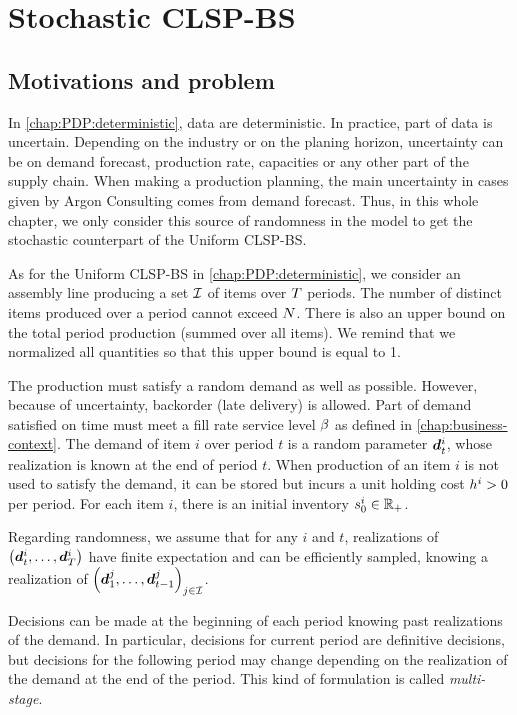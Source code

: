 \chapter{Stochastic CLSP-BS}
\label{chap:PDP:stochastic}

\section{Motivations and problem}


In \cref{chap:PDP:deterministic}, data are deterministic.
In practice, part of data is uncertain.
Depending on the industry or on the planing horizon, uncertainty can be on demand forecast, production rate, capacities or any other part of the supply chain.
When making a production planning, the main uncertainty in cases given by Argon Consulting comes from demand forecast.
Thus, in this whole chapter, we only consider this source of randomness in the model to get the stochastic counterpart of the Uniform CLSP-BS.


As for the Uniform CLSP-BS in \cref{chap:PDP:deterministic}, we consider an assembly line producing a set $\mathcal{I}$ of items over $T$ periods.
The number of distinct items produced over a period cannot exceed $N$.
There is also an upper bound on the total period production (summed over all items).
We remind that we normalized all quantities so that this upper bound is equal to 1.


The production must satisfy a random demand as well as possible.
However, because of uncertainty, backorder (\ie late delivery) is allowed.
Part of demand satisfied on time must meet a fill rate service level $\beta$ as defined in \cref{chap:business-context}.
The demand of item $i$ over period $t$ is a random parameter $\va\demand_t^i$, whose realization is known at the end of period $t$.
When production of an item $i$ is not used to satisfy the demand, it can be stored but incurs a unit holding cost $h^i>0$ per period.
For each item $i$, there is an initial inventory $s_0^i\in\mathbb{R}_+$.


Regarding randomness, we assume that for any $i$ and $t$, realizations of $\bracket{\va\demand_t^i,\ldots,\va\demand_{\horizon}^i}$ have finite expectation and can be efficiently sampled, knowing a realization of $\bracket{\va\demand_1^j,\ldots,\va\demand_{t-1}^j}_{j\in\REF}$.


Decisions can be made at the beginning of each period knowing past realizations of the demand.
In particular, decisions for current period are definitive decisions, but decisions for the following period may change depending on the realization of the demand at the end of the period.
This kind of formulation is called \emph{multi-stage}.


